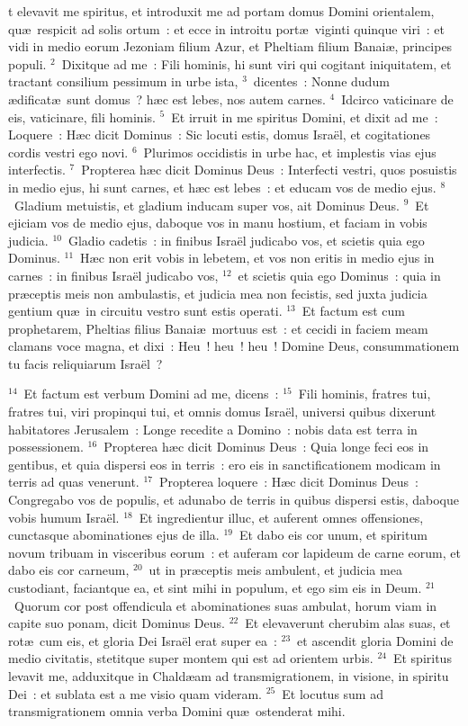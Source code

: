 \bchapter
{}t elevavit me spiritus, et introduxit me ad portam domus Domini orientalem, qu\ae\ respicit ad solis ortum~: et ecce in introitu port\ae\ viginti quinque viri~: et vidi in medio eorum Jezoniam filium Azur, et Pheltiam filium Banai\ae , principes populi.
${}^{2}$~Dixitque ad me~: Fili hominis, hi sunt viri qui cogitant iniquitatem, et tractant consilium pessimum in urbe ista,
${}^{3}$~dicentes~: Nonne dudum \ae dificat\ae\ sunt domus~? h\ae c est lebes, nos autem carnes.
${}^{4}$~Idcirco vaticinare de eis, vaticinare, fili hominis.
${}^{5}$~Et irruit in me spiritus Domini, et dixit ad me~: Loquere~: H\ae c dicit Dominus~: Sic locuti estis, domus Isra\"el, et cogitationes cordis vestri ego novi.
${}^{6}$~Plurimos occidistis in urbe hac, et implestis vias ejus interfectis.
${}^{7}$~Propterea h\ae c dicit Dominus Deus~: Interfecti vestri, quos posuistis in medio ejus, hi sunt carnes, et h\ae c est lebes~: et educam vos de medio ejus.
${}^{8}$~Gladium metuistis, et gladium inducam super vos, ait Dominus Deus.
${}^{9}$~Et ejiciam vos de medio ejus, daboque vos in manu hostium, et faciam in vobis judicia.
${}^{10}$~Gladio cadetis~: in finibus Isra\"el judicabo vos, et scietis quia ego Dominus.
${}^{11}$~H\ae c non erit vobis in lebetem, et vos non eritis in medio ejus in carnes~: in finibus Isra\"el judicabo vos,
${}^{12}$~et scietis quia ego Dominus~: quia in pr\ae ceptis meis non ambulastis, et judicia mea non fecistis, sed juxta judicia gentium qu\ae\ in circuitu vestro sunt estis operati.
${}^{13}$~Et factum est cum prophetarem, Pheltias filius Banai\ae\ mortuus est~: et cecidi in faciem meam clamans voce magna, et dixi~: Heu~! heu~! heu~! Domine Deus, consummationem tu facis reliquiarum Isra\"el~?


${}^{14}$~Et factum est verbum Domini ad me, dicens~:
${}^{15}$~Fili hominis, fratres tui, fratres tui, viri propinqui tui, et omnis domus Isra\"el, universi quibus dixerunt habitatores Jerusalem~: Longe recedite a Domino~: nobis data est terra in possessionem.
${}^{16}$~Propterea h\ae c dicit Dominus Deus~: Quia longe feci eos in gentibus, et quia dispersi eos in terris~: ero eis in sanctificationem modicam in terris ad quas venerunt.
${}^{17}$~Propterea loquere~: H\ae c dicit Dominus Deus~: Congregabo vos de populis, et adunabo de terris in quibus dispersi estis, daboque vobis humum Isra\"el.
${}^{18}$~Et ingredientur illuc, et auferent omnes offensiones, cunctasque abominationes ejus de illa.
${}^{19}$~Et dabo eis cor unum, et spiritum novum tribuam in visceribus eorum~: et auferam cor lapideum de carne eorum, et dabo eis cor carneum,
${}^{20}$~ut in pr\ae ceptis meis ambulent, et judicia mea custodiant, faciantque ea, et sint mihi in populum, et ego sim eis in Deum.
${}^{21}$~Quorum cor post offendicula et abominationes suas ambulat, horum viam in capite suo ponam, dicit Dominus Deus.
${}^{22}$~Et elevaverunt cherubim alas suas, et rot\ae\ cum eis, et gloria Dei Isra\"el erat super ea~:
${}^{23}$~et ascendit gloria Domini de medio civitatis, stetitque super montem qui est ad orientem urbis.
${}^{24}$~Et spiritus levavit me, adduxitque in Chald\ae am ad transmigrationem, in visione, in spiritu Dei~: et sublata est a me visio quam videram.
${}^{25}$~Et locutus sum ad transmigrationem omnia verba Domini qu\ae\ ostenderat mihi.


